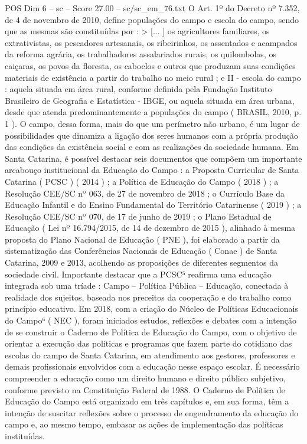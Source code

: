 \begin{textsample}{POS Dim 6 – sc – Score 27.00 – sc/sc\_em\_76.txt}
O Art. 1º do Decreto nº 7.352, de 4 de novembro de 2010, define populações do campo e escola do campo, sendo que as mesmas são constituídas por : > [... ] os agricultores familiares, os extrativistas, os pescadores artesanais, os ribeirinhos, os assentados e acampados da reforma agrária, os trabalhadores assalariados rurais, os quilombolas, os caiçaras, os povos da floresta, os caboclos e outros que produzam suas condições materiais de existência a partir do trabalho no meio rural ; e II - escola do campo : aquela situada em área rural, conforme definida pela Fundação Instituto Brasileiro de Geografia e Estatística - IBGE, ou aquela situada em área urbana, desde que atenda predominantemente a populações do campo ( BRASIL, 2010, p. 1 ).
O campo, dessa forma, mais do que um perímetro não urbano, é um lugar de possibilidades que dinamiza a ligação dos seres humanos com a própria produção das condições da existência social e com as realizações da sociedade humana.
Em Santa Catarina, é possível destacar seis documentos que compõem um importante arcabouço institucional da Educação do Campo : a Proposta Curricular de Santa Catarina ( PCSC ) ( 2014 ) ; a Política de Educação do Campo ( 2018 ) ; a Resolução CEE/SC nº 063, de 27 de novembro de 2018 ; o Currículo Base da Educação Infantil e do Ensino Fundamental do Território Catarinense ( 2019 ) ; a Resolução CEE/SC nº 070, de 17 de junho de 2019 ; o Plano Estadual de Educação ( Lei nº 16.794/2015, de 14 de dezembro de 2015 ), alinhado à mesma proposta do Plano Nacional de Educação ( PNE ), foi elaborado a partir da sistematização das Conferências Nacionais de Educação ( Conae ) de Santa Catarina, 2009 e 2013, acolhendo as proposições de diferentes segmentos da sociedade civil.
Importante destacar que a PCSC⁵ reafirma uma educação integrada sob uma tríade : Campo – Política Pública – Educação, conectada à realidade dos sujeitos, baseada nos preceitos da cooperação e do trabalho como princípio educativo.
Em 2018, com a criação do Núcleo de Políticas Educacionais do Campo⁶ ( NEC ), foram iniciados estudos, reflexões e debates com a intenção de se construir o Caderno de Política de Educação do Campo, com o objetivo de orientar a execução das políticas e programas que fazem parte do cotidiano das escolas do campo de Santa Catarina, em atendimento aos gestores, professores e demais profissionais envolvidos com a educação nesse espaço escolar.
É necessário compreender a educação como um direito humano e direito público subjetivo, conforme previsto na Constituição Federal de 1988.
O Caderno de Política de Educação do Campo está organizado em três capítulos e, em sua forma, têm a intenção de suscitar reflexões sobre o processo de engendramento da educação do campo e, ao mesmo tempo, embasar as ações de implementação das políticas instituídas.

\end{textsample}
